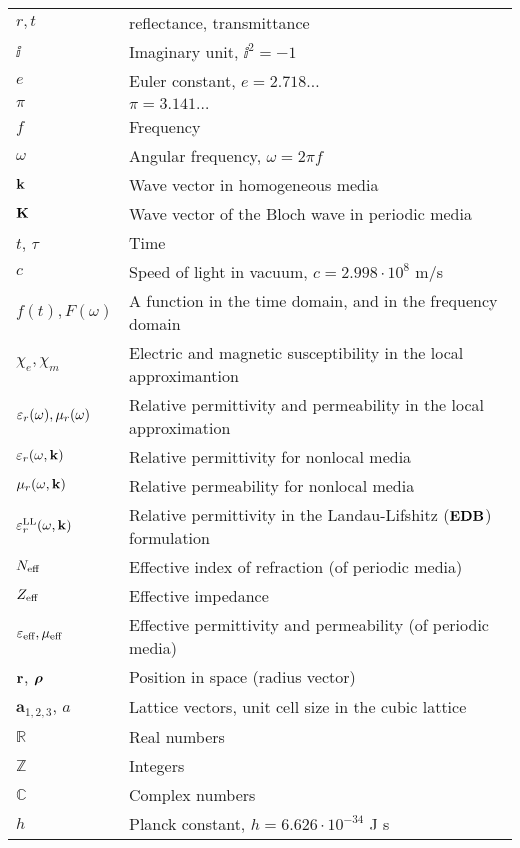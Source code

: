 \begin{table}[ht]
\begin{tabular}{ll}
$r, t$		& reflectance, transmittance\\
$\ii$		& Imaginary unit, $\ii^2 = -1$\\
$e$ 		& Euler constant, $e = 2.718\ldots$\\
$\pi$ 		& $\pi = 3.141\ldots$\\
$f$			& Frequency\\
$\omega$ 	& Angular frequency, $\omega = 2\pi f$\\
${\mathbf{k}}$ 		& Wave vector in homogeneous media\\
${\mathbf{K}}$ 		& Wave vector of the Bloch wave in periodic media\\
$t$, $\tau$ 		& Time\\
$c$ 		& Speed of light in vacuum, $c=2.998\cdot 10^8$ m/s \\
$f(t), F(\omega)$ & A function in the time domain, and in the frequency domain \\
$\chi_e,\chi_m$	& Electric and magnetic susceptibility in the local approximantion \\
$\varepsilon_r(\omega), \mu_r(\omega)$ &Relative permittivity and permeability in the local approximation\\
$\varepsilon_r(\omega, {\mathbf{k}})$ &Relative permittivity for nonlocal media\\
$\mu_r(\omega, {\mathbf{k}})$ &Relative permeability for nonlocal media\\
$\varepsilon_r^\text{LL}(\omega, {\mathbf{k}})$ &Relative permittivity in the Landau-Lifshitz ($\mathbf{E}\mathbf{D}\mathbf{B}$) formulation\\
$N_{\text{eff} }$ 	& Effective index of refraction (of periodic media)\\
$Z_{\text{eff} }$ 	& Effective impedance\\
$\varepsilon_{\text{eff} }, \mu_{\text{eff} }$ 	& Effective permittivity and permeability (of periodic media)\\
${\mathbf{r}}$, $\boldsymbol{\rho}$ 		& Position in space (radius vector)\\
$\mathbf{a}_{1,2,3}$, $a$ 		& Lattice vectors, unit cell size in the cubic lattice \\
$\mathbb{R}$		& Real numbers\\
$\mathbb{Z}$		& Integers\\
$\mathbb{C}$		& Complex numbers\\
$h$ 		& Planck constant, $h = 6.626\cdot 10^{-34}$ J s\\

 \bottomrule
 \end{tabular} \end{table}


